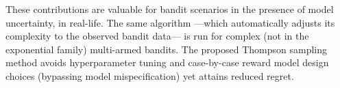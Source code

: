 These contributions are valuable for bandit scenarios in the presence of model uncertainty, \ie in real-life.
The same algorithm ---which automatically adjusts its complexity to the observed bandit data--- is run for complex (not in the exponential family) multi-armed bandits.
The proposed Thompson sampling method avoids hyperparameter tuning and case-by-case reward model design choices (bypassing model mispecification) yet attains reduced regret.